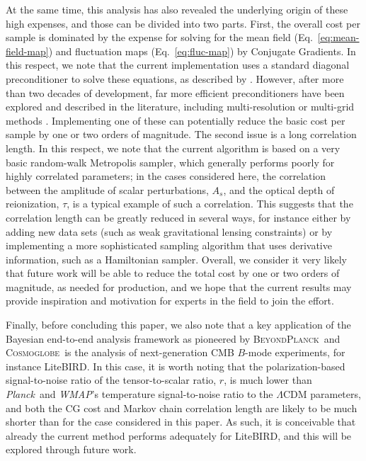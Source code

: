 \documentclass[twocolumn]{../common/aa}
\def\WMAP{\emph{WMAP}}
\def\Planck{\emph{Planck}}
\newcommand{\BP}{\textsc{BeyondPlanck}}
\newcommand{\cosmoglobe}{\textsc{Cosmoglobe}}
\begin{document}
At the same time, this analysis has also revealed the underlying origin of these high expenses, and those can be divided into two parts. First, the overall cost per sample is dominated by the expense for solving for the mean field (Eq.~\eqref{eq:mean-field-map}) and fluctuation maps (Eq.~\eqref{eq:fluc-map}) by Conjugate Gradients. In this respect, we note that the current implementation uses a standard diagonal preconditioner to solve these equations, as described by \citet{eriksen:2004}. However, after more than two decades of development, far more efficient preconditioners have been explored and described in the literature, including multi-resolution or multi-grid methods \citep[e.g.,][]{seljebotn:2013,seljebotn:2019}. Implementing one of these can potentially reduce the basic cost per sample by one or two orders of magnitude. The second issue is a long correlation length. In this respect, we note that the current algorithm is based on a very basic random-walk Metropolis sampler, which generally performs poorly for highly correlated parameters; in the cases considered here, the correlation between the amplitude of scalar perturbations, $A_s$, and the optical depth of reionization, $\tau$, is a typical example of such a correlation. This suggests that the correlation length can be greatly reduced in several ways, for instance either by adding new data sets (such as weak gravitational lensing constraints) or by implementing a more sophisticated sampling algorithm that uses derivative information, such as a Hamiltonian sampler. Overall, we consider it very likely that future work will be able to reduce the total cost by one or two orders of magnitude, as needed for production, and we hope that the current results may provide inspiration and motivation for experts in the field to join the effort.

Finally, before concluding this paper, we also note that a key application of the Bayesian end-to-end analysis framework as pioneered by \BP\ and \cosmoglobe\ is the analysis of next-generation CMB $B$-mode experiments, for instance LiteBIRD. In this case, it is worth noting that the polarization-based signal-to-noise ratio of the tensor-to-scalar ratio, $r$, is much lower than \Planck\ and \WMAP's temperature signal-to-noise ratio to the $\Lambda$CDM parameters, and both the CG cost and Markov chain correlation length are likely to be much shorter than for the case considered in this paper. As such, it is conceivable that already the current method performs adequately for LiteBIRD, and this will be explored through future work.
\end{document}

